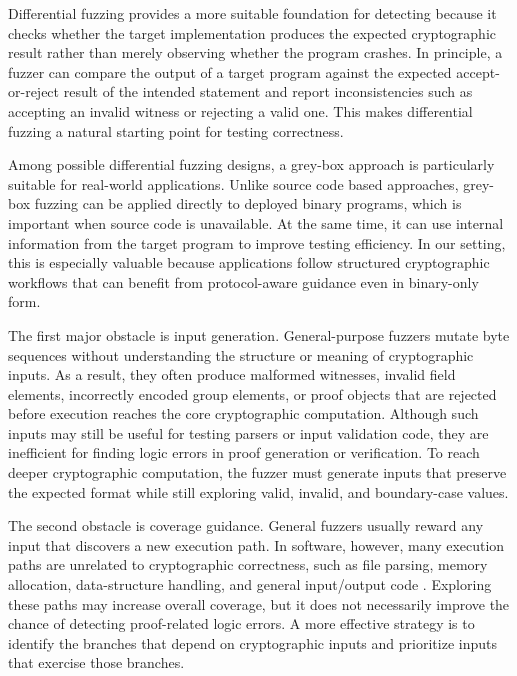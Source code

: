 Differential fuzzing provides a more suitable foundation for detecting \logicerror because it checks whether the target implementation produces the expected cryptographic result rather than merely observing whether the program crashes. In principle, a fuzzer can compare the output of a target \zksnark program against the expected accept-or-reject result of the intended statement and report inconsistencies such as accepting an invalid witness or rejecting a valid one. This makes differential fuzzing a natural starting point for testing \zksnark correctness.

Among possible differential fuzzing designs, a grey-box approach is particularly suitable for real-world \zksnark applications. Unlike source code based approaches, grey-box fuzzing can be applied directly to deployed binary programs, which is important when source code is unavailable. At the same time, it can use internal information from the target \zksnark program to improve testing efficiency. In our setting, this is especially valuable because \zksnark applications follow structured cryptographic workflows that can benefit from protocol-aware guidance even in binary-only form.

The first major obstacle is input generation. General-purpose fuzzers mutate byte sequences without understanding the structure or meaning of cryptographic inputs. As a result, they often produce malformed witnesses, invalid field elements, incorrectly encoded group elements, or proof objects that are rejected before execution reaches the core cryptographic computation. Although such inputs may still be useful for testing parsers or input validation code, they are inefficient for finding logic errors in proof generation or verification. To reach deeper cryptographic computation, the fuzzer must generate inputs that preserve the expected format while still exploring valid, invalid, and boundary-case values.

The second obstacle is coverage guidance. General fuzzers usually reward any input that discovers a new execution path. In \zksnark software, however, many execution paths are unrelated to cryptographic correctness, such as file parsing, memory allocation, data-structure handling, and general input/output code \cite{wen2024practical, 0xparc_zk_bug_tracker}. Exploring these paths may increase overall coverage, but it does not necessarily improve the chance of detecting proof-related logic errors. A more effective strategy is to identify the branches that depend on cryptographic inputs and prioritize inputs that exercise those branches.

